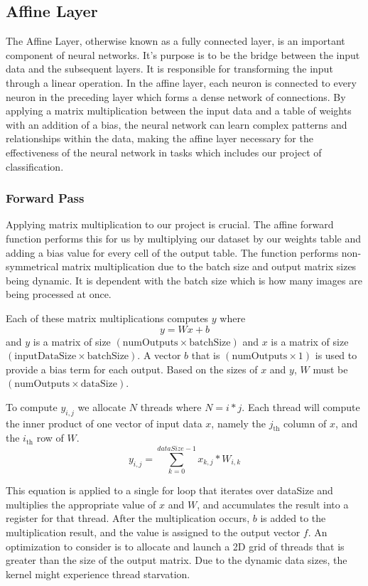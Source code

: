 \documentclass[conference]{IEEEtran}
\begin{document}
\subsection{Affine Layer}
The Affine Layer, otherwise known as a fully connected layer, is an important component of neural networks. It's purpose is to be the bridge between the input data and the subsequent layers. It is responsible for transforming the input through a linear operation. In the affine layer, each neuron is connected to every neuron in the preceding layer which forms a dense network of connections. By applying a matrix multiplication between the input data and a table of weights with an addition of a bias, the neural network can learn complex patterns and relationships within the data, making the affine layer necessary for the effectiveness of the neural network in tasks which includes our project of classification.

\subsubsection{Forward Pass}
Applying matrix multiplication to our project is crucial. The affine forward function performs this for us by multiplying our dataset by our weights table and adding a bias value for every cell of the output table. The function performs non-symmetrical matrix multiplication due to the batch size and output matrix sizes being dynamic. It is dependent with the batch size which is how many images are being processed at once.

Each of these matrix multiplications computes $y$ where $$y=Wx+b$$ and $y$ is a matrix of size $(\text{numOutputs} 
 \times \text{batchSize})$ and $x$ is a matrix of size $(\text{inputDataSize} 
 \times \text{batchSize})$. A vector $b$ that is $(\text{numOutputs}\times 1)$ is used to provide a bias term for each output. Based on the sizes of $x$ and $y$, $W$ must be $(\text{numOutputs} 
 \times \text{dataSize})$. 

 To compute $y_{i,j}$ we allocate $N$ threads where $N = i * j$. Each thread will compute the inner product of one vector of input data $x$, namely the $j_\text{th}$ column of $x$, and the $i_\text{th}$ row of $W$. $$y_{i,j}=\sum_{k=0}^{dataSize-1}{x_{k,j}*W_{i,k}}$$ 
 
 This equation is applied to a single for loop that iterates over dataSize and multiplies the appropriate value of $x$ and $W$, and accumulates the result into a register for that thread. After the multiplication occurs, $b$ is added to the multiplication result, and the value is assigned to the output vector $f$. An optimization to consider is to allocate and launch a 2D grid of threads that is greater than the size of the output matrix. Due to the dynamic data sizes, the kernel might experience thread starvation.
\end{document}
